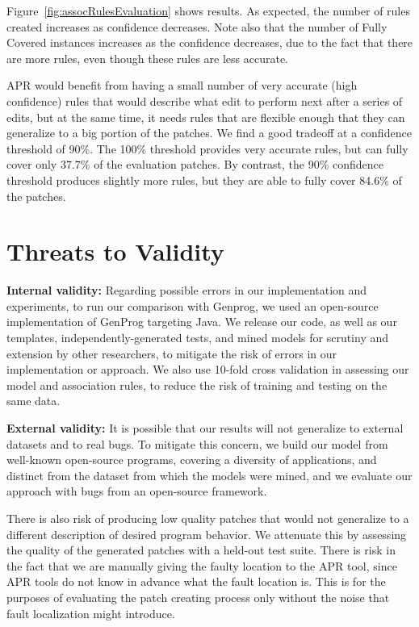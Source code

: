\documentclass[sigconf]{acmart}
\begin{document}
Figure~\ref{fig:assocRulesEvaluation} shows results.  As expected, the number of rules created
increases as confidence decreases.  Note also that the
number of Fully Covered instances increases as the confidence decreases, due to
the fact that there are more rules, even though these rules are less accurate.

APR would benefit from having a small number of very accurate (high confidence)
rules that would describe what edit to perform next after a series of edits, but
at the same time, it needs rules that are flexible enough that they can
generalize to a big portion of the patches.
%
We find a good tradeoff at a 
confidence threshold of 90\%. The 100\%
threshold provides very accurate rules, but can fully cover only
37.7\% of the evaluation patches. By contrast, the 90\% confidence
threshold produces slightly more rules, but they are able to fully cover 84.6\%
of the patches. 



\section{Threats to Validity} \label{threatsVal}

\noindent\textbf{Internal validity:}
Regarding possible errors in our implementation and experiments, to run our
comparison with Genprog, we used an open-source implementation of GenProg
targeting Java. We release our code, as well as our templates,
independently-generated tests, and mined models for scrutiny and extension by other
researchers, to mitigate the risk of errors in our implementation or approach. 
 We also use 10-fold cross validation in
assessing our model and association rules, to reduce the risk of training and testing on the same
data.  

\noindent\textbf{External validity:} 
It is possible 
that our results will not generalize to external datasets and to
real bugs. To mitigate this concern, we build our model from well-known open-source
programs, covering a diversity of applications, and distinct from the dataset
from which the models were mined, and we evaluate our approach with bugs from an open-source framework.

There is also risk of producing low quality patches that would not 
generalize
to a different description of desired program behavior. We attenuate 
this by 
assessing the quality of the generated patches with a held-out test suite.
There is risk in the fact that we are manually giving the
faulty location to the APR tool, since APR tools do not know in advance what the 
fault location is. This is for the purposes of evaluating the patch creating 
process
only without the noise that fault localization might introduce.
\end{document}
